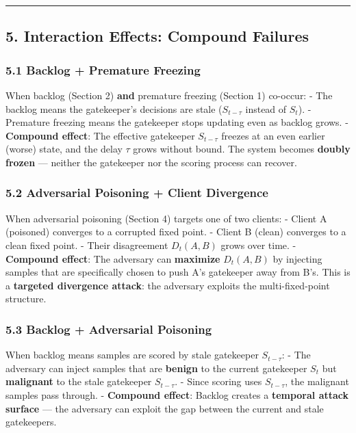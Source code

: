 \documentclass[
  12pt,
]{article}
\begin{document}
\begin{center}\rule{0.5\linewidth}{0.5pt}\end{center}

\subsection{5. Interaction Effects: Compound
Failures}\label{interaction-effects-compound-failures}

\subsubsection{5.1 Backlog + Premature
Freezing}\label{backlog-premature-freezing}

When backlog (Section 2) \textbf{and} premature freezing (Section 1)
co-occur: - The backlog means the gatekeeper's decisions are stale
(\(S_{t-\tau}\) instead of \(S_t\)). - Premature freezing means the
gatekeeper stops updating even as backlog grows. - \textbf{Compound
effect}: The effective gatekeeper \(S_{t-\tau}\) freezes at an even
earlier (worse) state, and the delay \(\tau\) grows without bound. The
system becomes \textbf{doubly frozen} --- neither the gatekeeper nor the
scoring process can recover.

\subsubsection{5.2 Adversarial Poisoning + Client
Divergence}\label{adversarial-poisoning-client-divergence}

When adversarial poisoning (Section 4) targets one of two clients: -
Client A (poisoned) converges to a corrupted fixed point. - Client B
(clean) converges to a clean fixed point. - Their disagreement
\(D_t(A, B)\) grows over time. - \textbf{Compound effect}: The adversary
can \textbf{maximize} \(D_t(A, B)\) by injecting samples that are
specifically chosen to push A's gatekeeper away from B's. This is a
\textbf{targeted divergence attack}: the adversary exploits the
multi-fixed-point structure.

\subsubsection{5.3 Backlog + Adversarial
Poisoning}\label{backlog-adversarial-poisoning}

When backlog means samples are scored by stale gatekeeper
\(S_{t-\tau}\): - The adversary can inject samples that are
\textbf{benign} to the current gatekeeper \(S_t\) but \textbf{malignant}
to the stale gatekeeper \(S_{t-\tau}\). - Since scoring uses
\(S_{t-\tau}\), the malignant samples pass through. - \textbf{Compound
effect}: Backlog creates a \textbf{temporal attack surface} --- the
adversary can exploit the gap between the current and stale gatekeepers.
\end{document}
